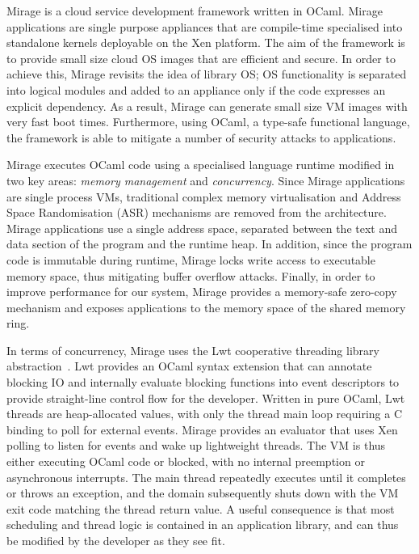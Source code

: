 \sdnsim  

Mirage is a cloud service development framework written in OCaml. Mirage
applications are single purpose appliances that are compile-time specialised
into standalone kernels deployable on the Xen platform. The aim of the framework
is to provide small size cloud OS images that are efficient and secure.  In
order to achieve this, Mirage revisits the idea of library OS; OS functionality
is separated into logical modules and added to an appliance only if the code
expresses an explicit dependency.  As a result, Mirage can generate small size
VM images with very fast boot times.  Furthermore, using OCaml, a type-safe
functional language, the framework is able to mitigate a number of security
attacks to applications.

Mirage executes OCaml code using a specialised language runtime modified in two
key areas: \textit{memory management} and \textit{concurrency}.  Since Mirage
applications are single process VMs, traditional complex memory virtualisation
and Address Space Randomisation (ASR) mechanisms are removed from the
architecture.  Mirage applications use a single address space, separated between
the text and data section of the program and the runtime heap. In addition,
since the program code is immutable during runtime, Mirage locks write access to
executable memory space, thus mitigating buffer overflow attacks.  Finally, in
order to improve performance for our system, Mirage provides a memory-safe
zero-copy mechanism and exposes applications to the memory space of the shared
memory ring.

In terms of concurrency, Mirage uses  the Lwt cooperative threading library
abstraction~\cite{lwt}. Lwt provides an OCaml syntax extension that can annotate
blocking IO and internally evaluate blocking functions into event
descriptors to provide straight-line control ﬂow for the developer.  Written in
pure OCaml, Lwt threads are heap-allocated values, with only the thread main
loop requiring a C binding to poll for external events.  Mirage provides an
evaluator that uses Xen polling to listen for events and wake up lightweight
threads. The VM is thus either executing OCaml code or blocked, with no internal
preemption or asynchronous interrupts. The main thread repeatedly executes until
it completes or throws an exception, and the domain subsequently shuts down with
the VM exit code matching the thread return value.  A useful consequence is that
most scheduling and thread logic is contained in an application library, and can
thus be modified by the developer as they see fit. 

